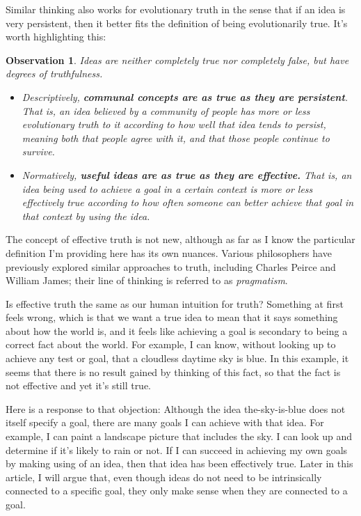 \documentclass[11pt, oneside]{article}   	%
\newtheorem{obs}{Observation}
\begin{document}
Similar thinking also works for evolutionary truth in the sense that if an idea
is very persistent, then it better fits the definition of being evolutionarily
true. It's worth highlighting this:
\begin{obs}
    Ideas are neither completely true nor completely false, but have degrees of
    truthfulness.
    \begin{itemize}
        \item Descriptively, {\bf communal concepts are as true as they are
            persistent}. That is, an idea believed by a community of people has
            more or less evolutionary truth to it according to how well that
            idea tends to persist, meaning both that people agree with it, and
            that those people continue to survive.
        \item Normatively, {\bf useful ideas are as true as they are effective.}
            That is, an idea being used to achieve a goal in a certain context
            is more or less effectively true according to how often someone can
            better achieve that goal in that context by using the idea.
    \end{itemize}
\end{obs}

The concept of effective truth is not new, although as far as I know the
particular definition I'm providing here has its own nuances.
Various philosophers have previously
explored similar approaches to truth, including Charles Peirce and William
James; their line of thinking is referred to as {\em pragmatism}.

Is effective truth the same as our human intuition for truth? Something at first
feels wrong, which is that we want a true idea to mean that it says something
about how the world is, and it feels like achieving a goal is secondary to being
a correct fact about the world. For example, I can know, without looking up to
achieve any test or goal, that a cloudless daytime sky is blue. In this example,
it seems that there is no result gained by thinking of this fact, so that the
fact is not effective and yet it's still true.

Here is a response to that objection:
Although the idea the-sky-is-blue does not itself specify a goal, there
are many goals I can achieve with that idea. For example, I can paint a
landscape picture that includes the sky.
I can look up and determine if it's likely to rain or not.
If I can succeed in achieving my own goals by making using of an
idea, then that idea has been effectively true.
Later in this article, I will argue that, even though ideas do not need to be
intrinsically connected to a specific goal, they only make sense when they are
connected to a goal.
\end{document}
